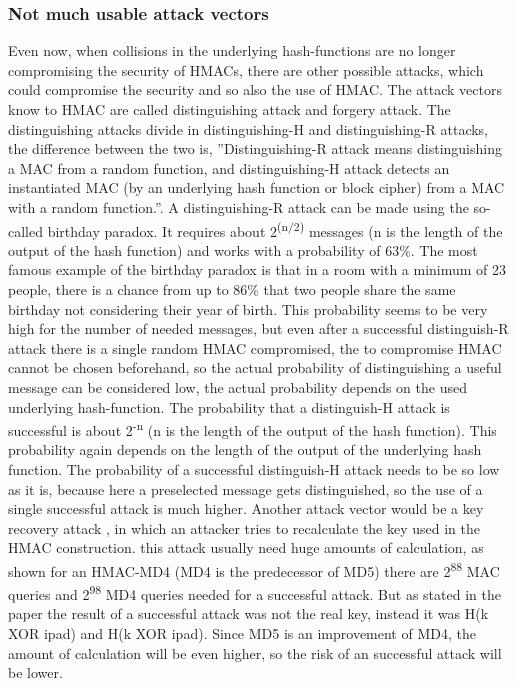 \subsubsection{Not much usable attack vectors}
Even now, when collisions in the underlying hash-functions are no longer compromising the security of HMACs, there are other possible attacks, which could compromise the security and so also the use of HMAC. The attack vectors know to HMAC are called distinguishing attack and forgery attack. The distinguishing attacks divide in distinguishing-H and distinguishing-R attacks, the difference between the two is, ''Distinguishing-R attack means distinguishing a MAC from a random function, and distinguishing-H attack detects an instantiated MAC (by an underlying hash function or block cipher) from a MAC with a random function.''\cite{ATT1}. A distinguishing-R attack can be made using the so-called birthday paradox. It requires about 2\textsuperscript{(n$/$2)} messages (n is the length of the output of the hash function) and works with a probability of 63\%\cite{ATT1}. The most famous example of the birthday paradox is that in a room with a minimum of 23 people, there is a chance from up to 86\% that two people share the same birthday not considering their year of birth. This probability seems to be very high for the number of needed messages, but even after a successful distinguish-R attack there is a single random HMAC compromised, the to compromise HMAC cannot be chosen beforehand, so the actual probability of distinguishing a useful message can be considered low, the actual probability depends on the used underlying hash-function. The probability that a distinguish-H attack is successful is about 2\textsuperscript{-n}\cite{ATT1} (n is the length of the output of the hash function). This probability again depends on the length of the output of the underlying hash function. The probability of a successful distinguish-H attack needs to be so low as it is, because here a preselected message gets distinguished, so the use of a single successful attack is much higher. Another attack vector would be a key recovery attack \cite{key-recov}, in which an attacker tries to recalculate the key used in the HMAC construction. this attack usually need huge amounts of calculation, as shown for an HMAC-MD4 (MD4 is the predecessor of MD5) there are 2\textsuperscript{88} MAC queries and 2\textsuperscript{98} MD4 queries needed for a successful attack. But as stated in the paper the result of a successful attack was not the real key, instead it was H(k XOR ipad) and H(k XOR ipad). Since MD5 is an improvement of MD4, the amount of calculation will be even higher, so the risk of an successful attack will be lower.

